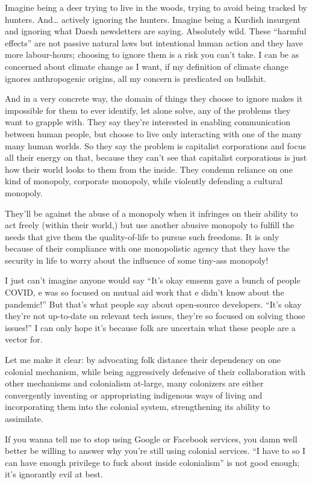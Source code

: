\documentclass[11pt]{article}
\begin{document}
\begin{itemize}
Imagine being a deer trying to live in the woods, trying to avoid being tracked by hunters. And… actively ignoring the hunters. Imagine being a Kurdish insurgent and ignoring what Daesh newsletters are saying. Absolutely wild. These “harmful effects” are not passive natural laws but intentional human action and they have more labour-hours; choosing to ignore them is a risk you can’t take. I can be as concerned about climate change as I want, if my definition of climate change ignores anthropogenic origins, all my concern is predicated on bullshit.

And in a very concrete way, the domain of things they choose to ignore makes it impossible for them to ever identify, let alone solve, any of the problems they want to grapple with. They say they’re interested in enabling communication between human people, but choose to live only interacting with one of the many many human worlds. So they say the problem is capitalist corporations and focus all their energy on that, because they can’t see that capitalist corporations is just how their world looks to them from the inside. They condemn reliance on one kind of monopoly, corporate monopoly, while violently defending a cultural monopoly.

They’ll be against the abuse of a monopoly when it infringes on their ability to act freely (within their world,) but use another abusive monopoly to fulfill the needs that give them the quality-of-life to pursue such freedoms. It is only because of their compliance with one monopolistic agency that they have the security in life to worry about the influence of some tiny-ass monopoly!

I just can’t imagine anyone would say “It’s okay emsenn gave a bunch of people COVID, e was so focused on mutual aid work that e didn’t know about the pandemic!” But that’s what people say about open-source developers. “It’s okay they’re not up-to-date on relevant tech issues, they’re so focused on solving those issues!” I can only hope it’s because folk are uncertain what these people are a vector for.

Let me make it clear: by advocating folk distance their dependency on one colonial mechanism, while being aggressively defensive of their collaboration with other mechanisms and colonialism at-large, many colonizers are either convergently inventing or appropriating indigenous ways of living and incorporating them into the colonial system, strengthening its ability to assimilate.

If you wanna tell me to stop using Google or Facebook services, you damn well better be willing to answer why you’re still using colonial services. “I have to so I can have enough privilege to fuck about inside colonialism” is not good enough; it’s ignorantly evil at best.


\end{itemize}
\end{document}
